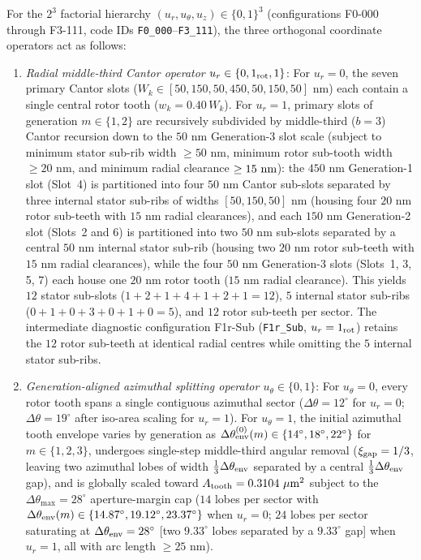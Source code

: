 \documentclass[pdflatex,sn-nature]{sn-jnl}
\DeclareRobustCommand{\roundfour}[1]{\fpeval{round(#1,4)}}
\begin{document}
For the $2^3$ factorial hierarchy $(u_r, u_\theta, u_z) \in \{0,1\}^3$ (configurations F0-000 through F3-111, code IDs \texttt{F0\_000}--\texttt{F3\_111}), the three orthogonal coordinate operators act as follows:
\begin{enumerate}
    \item \emph{Radial middle-third Cantor operator $u_r \in \{0, 1_{\rm rot}, 1\}$}: For $u_r = 0$, the seven primary Cantor slots ($W_k \in [50, 150, 50, 450, 50, 150, 50]\text{ nm}$) each contain a single central rotor tooth ($w_k = 0.40\,W_k$). For $u_r = 1$, primary slots of generation $m \in \{1,2\}$ are recursively subdivided by middle-third ($b=3$) Cantor recursion down to the $50\text{ nm}$ Generation-3 slot scale (subject to minimum stator sub-rib width $\ge 50\text{ nm}$, minimum rotor sub-tooth width $\ge 20\text{ nm}$, and minimum radial clearance $\ge 15{}\text{ nm}$): the $450\text{ nm}$ Generation-1 slot (Slot~4) is partitioned into four $50\text{ nm}$ Cantor sub-slots separated by three internal stator sub-ribs of widths $[50, 150, 50]\text{ nm}$ (housing four $20\text{ nm}$ rotor sub-teeth with $15\text{ nm}$ radial clearances), and each $150\text{ nm}$ Generation-2 slot (Slots~2 and 6) is partitioned into two $50\text{ nm}$ sub-slots separated by a central $50\text{ nm}$ internal stator sub-rib (housing two $20\text{ nm}$ rotor sub-teeth with $15\text{ nm}$ radial clearances), while the four $50\text{ nm}$ Generation-3 slots (Slots~1, 3, 5, 7) each house one $20\text{ nm}$ rotor tooth ($15\text{ nm}$ radial clearance). This yields $12$ stator sub-slots ($1+2+1+4+1+2+1=12$), $5$ internal stator sub-ribs ($0+1+0+3+0+1+0=5$), and $12$ rotor sub-teeth per sector. The intermediate diagnostic configuration F1r-Sub (\texttt{F1r\_Sub}, $u_r = 1_{\rm rot}$) retains the $12$ rotor sub-teeth at identical radial centres while omitting the $5$ internal stator sub-ribs.
    \item \emph{Generation-aligned azimuthal splitting operator $u_\theta \in \{0, 1\}$}: For $u_\theta = 0$, every rotor tooth spans a single contiguous azimuthal sector ($\Delta\theta = 12^\circ$ for $u_r=0$; $\Delta\theta = 19^\circ$ after iso-area scaling for $u_r=1$). For $u_\theta = 1$, the initial azimuthal tooth envelope varies by generation as $\Delta\theta_{\rm env}^{(0)}(m) \in \{14^\circ, 18^\circ, 22^\circ\}$ for $m \in \{1,2,3\}$, undergoes single-step middle-third angular removal ($\xi_{\rm gap} = 1/3$, leaving two azimuthal lobes of width $\frac{1}{3}\Delta\theta_{\rm env}$ separated by a central $\frac{1}{3}\Delta\theta_{\rm env}$ gap), and is globally scaled toward $A_{\rm tooth} = \roundfour{\NthreeUnithreedFzerozerozeroAreaUmtwo}\ \mu\text{m}^2$ subject to the $\Delta\theta_{\max} = 28^\circ$ aperture-margin cap ($14$ lobes per sector with $\Delta\theta_{\rm env}(m) \in \{14.87^\circ, 19.12^\circ, 23.37^\circ\}$ when $u_r = 0$; $24$ lobes per sector saturating at $\Delta\theta_{\rm env} = 28^\circ$ [two $9.33^\circ$ lobes separated by a $9.33^\circ$ gap] when $u_r = 1$, all with arc length $\ge 25\text{ nm}$).

\end{enumerate}
\end{document}
